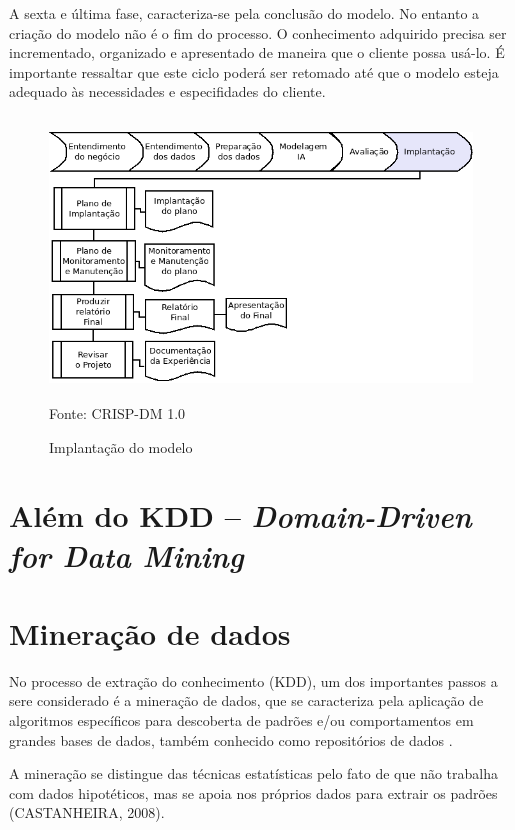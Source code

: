 
A sexta e última fase, caracteriza-se pela conclusão do modelo. No entanto a criação do modelo não é o fim do processo.
O conhecimento adquirido precisa ser incrementado, organizado e apresentado de maneira que o cliente possa usá-lo.
É importante ressaltar que este ciclo poderá ser retomado até que o modelo esteja adequado às necessidades e especifidades do cliente.

\begin{figure}[!ht]
\centering
\caption{Implantação do modelo}
\vspace{1mm}
\includegraphics[width=120mm, height=75mm]{Figuras/Cronograma/Inplantacao.png}\\
\tiny Fonte: CRISP-DM 1.0
\end{figure}


\pagebreak

\section{Além do KDD -- \textit{Domain-Driven for Data Mining}}


\pagebreak

\section{Mineração de dados}

No processo de extração do conhecimento (KDD), um dos importantes passos a sere considerado é a mineração de dados, que se caracteriza pela aplicação de algoritmos 
específicos para descoberta de padrões e/ou comportamentos em grandes bases de dados, também conhecido como repositórios de dados \cite{FayyadUeoutros}.

A mineração se distingue das técnicas estatísticas pelo fato de que  não trabalha com dados hipotéticos, mas se apoia nos próprios dados para extrair os padrões (CASTANHEIRA, 2008). 

